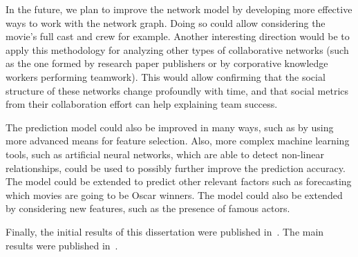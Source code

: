 In the future, we plan to improve the network model by developing more
effective ways to work with the network graph. Doing so could allow considering
the movie's full cast and crew for example. Another interesting direction would
be to apply this methodology for analyzing other types of collaborative
networks (such as the one formed by research paper publishers or by corporative
knowledge workers performing teamwork). This would allow confirming that the
social structure of these networks change profoundly with time, and that social
metrics from their collaboration effort can help explaining team success.

The prediction model could also be improved in many ways, such as by using more
advanced means for feature selection. Also, more complex machine learning
tools, such as artificial neural networks, which are able to detect non-linear
relationships, could be used to possibly further improve the prediction
accuracy. The model could be extended to predict other relevant factors such as
forecasting which movies are going to be Oscar winners. The model could also be
extended by considering new features, such as the presence of famous actors.

Finally, the initial results of this dissertation were published
in~\cite{laweb}. The main results were published in~\cite{sac}.
